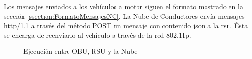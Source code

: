 Los mensajes enviados a los vehículos a motor siguen el formato mostrado en la sección \ref{ssection:FormatoMensajesNC}. La Nube de Conductores envía mensajes \gls{http/1.1} a través del método POST un mensaje con contenido \gls{json} a la \gls{rsu}. Ésta se encarga de reenviarlo al vehículo a través de la red \gls{802.11p}.

\begin{figure}[h]
	\begin{center}
		\caption{Ejecución entre OBU, RSU y la Nube}
		\label{fig:DiagSecuencia-OBU_Cloud}
	\end{center}
\end{figure}
\FloatBarrier
